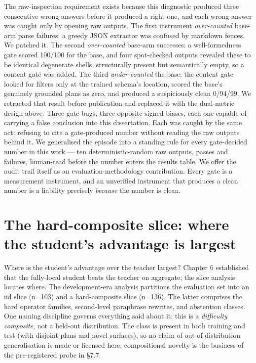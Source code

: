 The raw-inspection requirement exists because this diagnostic produced three consecutive wrong answers before it produced a right one, and each wrong answer was caught only by opening raw outputs. The first instrument \emph{over-counted} base-arm parse failures: a greedy JSON extractor was confused by markdown fences. We patched it. The second \emph{over-counted} base-arm successes: a well-formedness gate scored 100/100 for the base, and four spot-checked outputs revealed these to be identical degenerate shells, structurally present but semantically empty, so a content gate was added. The third \emph{under-counted} the base: the content gate looked for filters only at the trained schema's location, scored the base's genuinely grounded plans as zero, and produced a suspiciously clean 0/94/99. We retracted that result before publication and replaced it with the dual-metric design above. Three gate bugs, three opposite-signed biases, each one capable of carrying a false conclusion into this dissertation. Each was caught by the same act: refusing to cite a gate-produced number without reading the raw outputs behind it. We generalised the episode into a standing rule for every gate-decided number in this work --- ten deterministic-random raw outputs, passes and failures, human-read before the number enters the results table. We offer the audit trail itself as an evaluation-methodology contribution. Every gate is a measurement instrument, and an unverified instrument that produces a clean number is a liability precisely \emph{because} the number is clean.

\section{The hard-composite slice: where the student's advantage is largest}\label{sec:the-hard-composite-slice-where-the-stude}

Where is the student's advantage over the teacher largest? Chapter 6 established that the fully-local student beats the teacher on aggregate; the slice analysis locates where. The development-era analysis partitions the evaluation set into an iid slice (n=103) and a hard-composite slice (n=136). The latter comprises the hard operator families, second-level paraphrase rewrites, and abstention classes. One naming discipline governs everything said about it: this is a \emph{difficulty composite}, not a held-out distribution. The class is present in both training and test (with disjoint plans and novel surfaces), so no claim of out-of-distribution generalisation is made or licensed here; compositional novelty is the business of the pre-registered probe in \S7.7.

